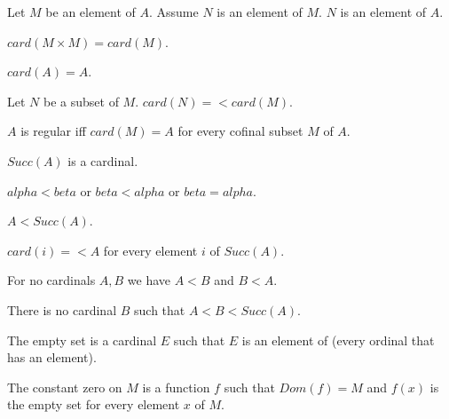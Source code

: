 \documentclass{article}
\newcommand{\Prod}[2]{#1\times #2}
\begin{document}
\begin{forthel}
    \begin{axiom}[Transitivity]
      Let $M$ be an element of $A$. Assume $N$ is an element of $M$. $N$ is an element of $A$.
    \end{axiom}

    \begin{axiom}
      $card(\Prod{M}{M}) = card(M)$.
    \end{axiom}

    \begin{axiom}
      $card(A) = A$.
    \end{axiom}

    \begin{axiom}
      Let $N$ be a subset of $M$. $card(N) =< card(M)$.
    \end{axiom}

    \begin{definition}
      $A$ is regular iff $card(M) = A$ for every cofinal subset $M$ of $A$.
    \end{definition}

    \begin{signature}
      $Succ(A)$ is a cardinal.
    \end{signature}

    \begin{axiom}
      $alpha < beta$ or $beta < alpha$ or $beta = alpha$.
    \end{axiom}

    \begin{axiom}
      $A < Succ(A)$.
    \end{axiom}

    \begin{axiom}
      $card(i) =< A$ for every element $i$ of $Succ(A)$.
    \end{axiom}

    \begin{axiom}
      For no cardinals $A,B$ we have $A < B$ and $B < A$.
    \end{axiom}

    \begin{axiom}
      There is no cardinal $B$ such that $A < B < Succ(A)$.
    \end{axiom}

    \begin{definition}
      The empty set is a cardinal $E$ such that $E$ is an element of (every ordinal that has an element).
    \end{definition}

    \begin{definition}
      The constant zero on $M$ is a function $f$ such that $Dom(f) = M$ and $f(x)$ is the empty set for every element $x$ of $M$.
    \end{definition}


\end{forthel}
\end{document}
